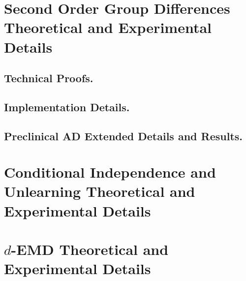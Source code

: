 
\chapter{Second Order Group Differences Theoretical and Experimental Details}
\section{Technical Proofs.}

\section{Implementation Details.}


\section{Preclinical AD Extended Details and Results.}




%
\chapter{Conditional Independence and Unlearning Theoretical and Experimental Details}





\chapter{$d$-EMD Theoretical and Experimental Details}








% 
